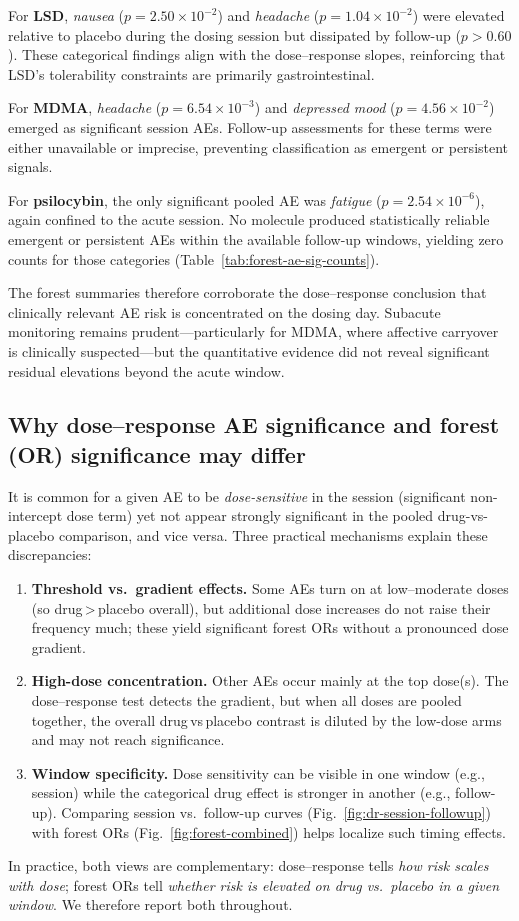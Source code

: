For \textbf{LSD}, \textit{nausea} ($p=2.50\times10^{-2}$) and \textit{headache} ($p=1.04\times10^{-2}$) were elevated relative to placebo during the dosing session but dissipated by follow-up ($p>0.60$).
These categorical findings align with the dose–response slopes, reinforcing that LSD’s tolerability constraints are primarily gastrointestinal.

For \textbf{MDMA}, \textit{headache} ($p=6.54\times10^{-3}$) and \textit{depressed mood} ($p=4.56\times10^{-2}$) emerged as significant session AEs.
Follow-up assessments for these terms were either unavailable or imprecise, preventing classification as emergent or persistent signals.

For \textbf{psilocybin}, the only significant pooled AE was \textit{fatigue} ($p=2.54\times10^{-6}$), again confined to the acute session.
No molecule produced statistically reliable emergent or persistent AEs within the available follow-up windows, yielding zero counts for those categories (Table~\ref{tab:forest-ae-sig-counts}).

The forest summaries therefore corroborate the dose–response conclusion that clinically relevant AE risk is concentrated on the dosing day.
Subacute monitoring remains prudent---particularly for MDMA, where affective carryover is clinically suspected---but the quantitative evidence did not reveal significant residual elevations beyond the acute window.




\subsection{Why dose–response AE significance and forest (OR) significance may differ}

It is common for a given AE to be \emph{dose-sensitive} in the session (significant non-intercept dose term) yet not appear strongly significant in the pooled drug-vs-placebo comparison, and vice versa. Three practical mechanisms explain these discrepancies:

\begin{enumerate}
  \item \textbf{Threshold vs.\ gradient effects.} Some AEs turn on at low–moderate doses (so drug\,>\,placebo overall), but additional dose increases do not raise their frequency much; these yield significant forest ORs without a pronounced dose gradient.
  \item \textbf{High-dose concentration.} Other AEs occur mainly at the top dose(s). The dose–response test detects the gradient, but when all doses are pooled together, the overall drug\,vs\,placebo contrast is diluted by the low-dose arms and may not reach significance.
  \item \textbf{Window specificity.} Dose sensitivity can be visible in one window (e.g., session) while the categorical drug effect is stronger in another (e.g., follow-up). Comparing session vs.\ follow-up curves (Fig.~\ref{fig:dr-session-followup}) with forest ORs (Fig.~\ref{fig:forest-combined}) helps localize such timing effects.
\end{enumerate}

In practice, both views are complementary: dose–response tells \emph{how risk scales with dose}; forest ORs tell \emph{whether risk is elevated on drug vs.\ placebo in a given window}. We therefore report both throughout.
